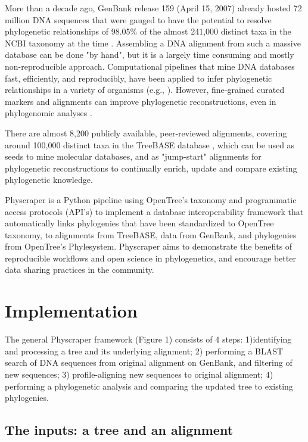 \documentclass{bmcart}
\begin{document}
More than a decade ago, GenBank release 159 (April 15, 2007) already hosted 72
million DNA sequences that were gauged to have the potential to resolve phylogenetic
relationships of 98.05\% of the almost 241,000
distinct taxa in the NCBI taxonomy at the time \cite{sanderson2008phylota}.
Assembling a DNA alignment from such a massive database can be done "by hand",
but it is a largely time consuming and mostly non-reproducible approach.
Computational pipelines that mine DNA databases fast, efficiently, and reproducibly,
have been applied to infer phylogenetic relationships in a variety of organisms
(e.g., \cite{smith2009mega, antonelli2017toward, izquierdo2014pumper}).
However, fine-grained curated markers and alignments can improve phylogenetic
reconstructions, even in phylogenomic analyses \cite{fragoso2017pilot}.

There are almost 8,200 publicly available, peer-reviewed alignments, covering
around 100,000 distinct taxa in the TreeBASE database \cite{piel2009treebase}, which
can be used as seeds to mine molecular databases, and as "jump-start" alignments
for phylogenetic reconstructions \cite{morrison2006multiple} to continually enrich,
update and compare existing phylogenetic knowledge.

Physcraper is a Python pipeline using OpenTree's taxonomy and programmatic access
protocols (API's) to implement a database interoperability framework that automatically
links phylogenies that have been standardized to OpenTree taxonomy, to alignments
from TreeBASE, data from GenBank, and phylogenies from OpenTree's Phylesystem.
Physcraper aims to demonstrate the benefits of reproducible workflows and open
science in phylogenetics, and encourage better data sharing practices in the community.


\section*{Implementation}

The general Physcraper framework (Figure 1) consists of 4 steps: 1)identifying and
processing a tree and its underlying alignment; 2) performing a BLAST search of
DNA sequences from original alignment on GenBank, and filtering of new sequences;
3) profile-aligning new sequences to original alignment; 4) performing a phylogenetic
analysis and comparing the updated tree to existing phylogenies.

\subsection*{The inputs: a tree and an alignment}
\end{document}
